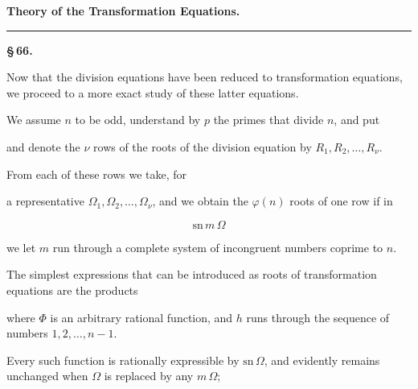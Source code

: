\begin{center}

\medskip
{\Large\textbf{Theory of the Transformation Equations.}}

\medskip
\rule{3cm}{0.4pt}
\end{center}

\begin{center}
\textbf{\S\,66. }
\end{center}

Now that the division equations have been reduced to transformation equations, we proceed to a more exact study of these latter equations.

We assume $n$ to be odd, understand by $p$ the primes that divide $n$, and put


and denote the $\nu$ rows of the roots of the division equation by $R_1, R_2, \ldots, R_\nu$.

From each of these rows we take, for


a representative $\Omega_1, \Omega_2, \ldots, \Omega_\nu$, and we obtain the $\varphi(n)$ roots of one row if in

\[
\mathrm{sn}\, m\,\Omega
\]

we let $m$ run through a complete system of incongruent numbers coprime to $n$.

The simplest expressions that can be introduced as roots of transformation equations are the products


where $\Phi$ is an arbitrary rational function, and $h$ runs through the sequence of numbers $1, 2, \ldots, n-1$.

Every such function is rationally expressible by $\mathrm{sn}\,\Omega$, and evidently remains unchanged when $\Omega$ is replaced by any $m\,\Omega$;
